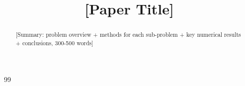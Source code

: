 \documentclass[bwprint]{apmcmthesis}
\title{[Paper Title]}
\begin{document}
\makecontrolsheet
\maketitle

\begin{abstract}

[Summary: problem overview + methods for each sub-problem + key numerical results + conclusions, 300-500 words]

\keywords{[Keyword1]; [Keyword2]; [Keyword3]}
\end{abstract}

\newpage
\tableofcontents
\newpage









\begin{thebibliography}{99}
\end{thebibliography}

\begin{appendices}

\end{appendices}
\end{document}
